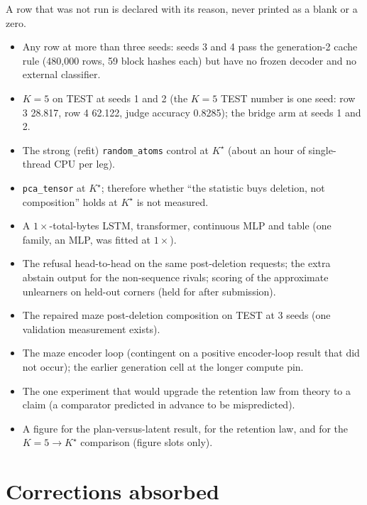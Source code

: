 \documentclass{article} %
\newcommand{\Kstar}{\ensuremath{K^{\star}}}
\begin{document}
A row that was not run is declared with its reason, never printed as a blank or a zero.
\begin{itemize}[leftmargin=*,itemsep=1pt]
\item Any row at more than three seeds: seeds 3 and 4 pass the generation-2 cache rule
  (480,000 rows, 59 block hashes each) but have no frozen decoder and no external classifier.
\item $K=5$ on TEST at seeds 1 and 2 (the $K=5$ TEST number is one seed: row 3 28.817, row 4
  62.122, judge accuracy 0.8285); the bridge arm at seeds 1 and 2. %
\item The strong (refit) \texttt{random\_atoms} control at $\Kstar$ (about an hour of
  single-thread CPU per leg). %
\item \texttt{pca\_tensor} at $\Kstar$; therefore whether ``the statistic buys deletion, not
  composition'' holds at $\Kstar$ is not measured.
\item A $1\times$-total-bytes LSTM, transformer, continuous MLP and table (one family, an MLP, was
  fitted at $1\times$).
\item The refusal head-to-head on the same post-deletion requests; the extra abstain output for the
  non-sequence rivals; scoring of the approximate unlearners on held-out corners (held for after
  submission).
\item The repaired maze post-deletion composition on TEST at 3 seeds (one validation measurement
  exists).
\item The maze encoder loop (contingent on a positive encoder-loop result that did not occur); the
  earlier generation cell at the longer compute pin.
\item The one experiment that would upgrade the retention law from theory to a claim (a comparator
  predicted in advance to be mispredicted).
\item A figure for the plan-versus-latent result, for the retention law, and for the $K=5\to\Kstar$
  comparison (figure slots only).
\end{itemize}

\section{Corrections absorbed}
\label{app:corrections}
\end{document}
